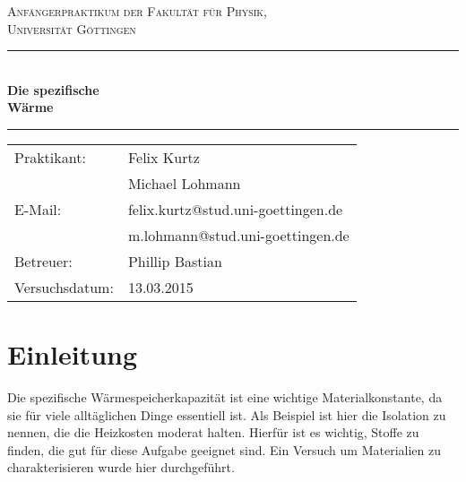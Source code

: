 \documentclass[12pt,a4paper,titlepage,headinclude,bibtotoc]{scrartcl}
\begin{document}
\begin{titlepage}
\centering
\textsc{\Large Anfängerpraktikum der Fakultät für
  Physik,\\[1.5ex] Universität Göttingen}

\vspace*{4.2cm}

\rule{\textwidth}{1pt}\\[0.5cm]
{\huge \bfseries
  Die spezifische\\[1.5ex]
  Wärme}\\[0.5cm]
\rule{\textwidth}{1pt}

\vspace*{3.0cm}

\begin{Large}
\begin{tabular}{ll}
Praktikant:
 	&  Felix Kurtz\\
 	&  Michael Lohmann\\

E-Mail: 
	&  felix.kurtz@stud.uni-goettingen.de\\
	& m.lohmann@stud.uni-goettingen.de\\

 Betreuer: & Phillip Bastian\\
 Versuchsdatum: &  13.03.2015\\
\end{tabular}
\end{Large}

\vspace*{0.8cm}

\begin{Large}
\end{Large}

\end{titlepage}

\tableofcontents

\newpage

\section{Einleitung}
\label{sec:einleitung}
Die spezifische Wärmespeicherkapazität ist eine wichtige Materialkonstante, da sie für viele alltäglichen Dinge essentiell ist.
Als Beispiel ist hier die Isolation zu nennen, die die Heizkosten moderat halten.
Hierfür ist es wichtig, Stoffe zu finden, die gut für diese Aufgabe geeignet sind.
Ein Versuch um Materialien zu charakterisieren wurde hier durchgeführt.
\end{document}
